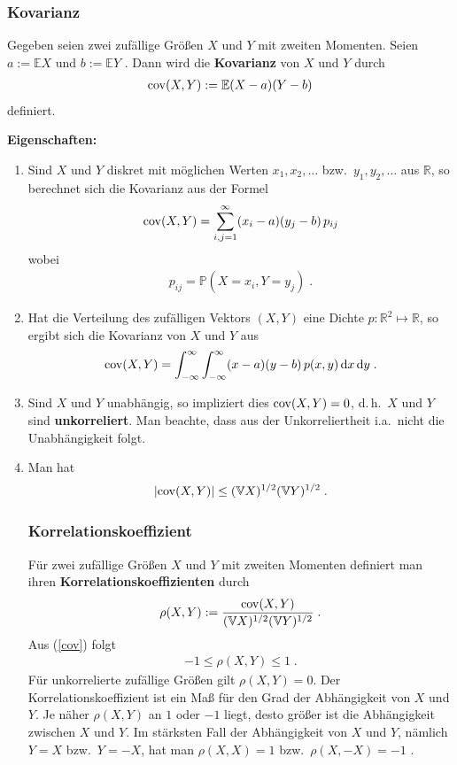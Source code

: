 \documentclass[ngerman,draft,parskip=half,twoside]{scrartcl}
\newcommand*{\R}{\mathbb{R}}      %
\newcommand*{\E}{\mathbb{E}}        %
\newcommand*{\V}{\mathbb{V}}        %
\newcommand*{\WKM}{\mathbb{P}}      %
\begin{document}
\subsubsection{Kovarianz}
Gegeben seien zwei zufällige Größen $X$ und $Y$ mit zweiten Momenten.
Seien $a:=\E X$ und $b:=\E Y$ . Dann wird die \textbf{Kovarianz} von $X$ und $Y$ durch
\begin{gather*}
  {\rm  cov}(X,Y):= \E(X-a)(Y-b)
\end{gather*}
definiert.

\textbf{Eigenschaften:}

\begin{enumerate}
\item
Sind $X$ und $Y$ diskret mit möglichen Werten $x_1,x_2,\ldots$ bzw.~$y_1,y_2,\ldots$ aus $\R$,
so berechnet sich die Kovarianz aus der Formel
  \begin{gather*}
    {\rm  cov}(X,Y)=\sum_{i,j=1}^\infty (x_i-a)(y_j-b)\, p_{ij}
  \end{gather*}
wobei
  \begin{gather*}
    p_{ij}=\WKM(X=x_i, Y=y_j)\;.
  \end{gather*}
\item
Hat die Verteilung des zufälligen Vektors $(X,Y)$ eine Dichte $p \colon\R^2\mapsto\R$, so
ergibt sich die Kovarianz von $X$ und $Y$ aus
  \begin{gather*}
    {\rm  cov}(X,Y)=\int_{-\infty}^\infty \int_{-\infty}^\infty (x-a)(y-b)\,p(x,y)\,\mathrm d x\, \mathrm d y\;.
  \end{gather*}
\item
Sind $X$ und $Y$ unabhängig, so impliziert dies ${\rm  cov}(X,Y)=0$, d.\,h.~$X$ und $Y$ sind
\textbf{unkorreliert}. Man beachte, dass aus der Unkorreliertheit i.a.~nicht die Unabhängigkeit folgt.
\item
Man hat
\begin{gather}
\label{cov}
|{\rm  cov}(X,Y)|\le (\V X)^{1/2}(\V Y)^{1/2}\;.
\end{gather}
\subsubsection{Korrelationskoeffizient}
Für zwei zufällige Größen $X$ und $Y$ mit zweiten Momenten definiert man ihren
\textbf{Korrelationskoeffizienten} durch
  \begin{gather*}
    \rho(X,Y):=\frac{{\rm  cov}(X,Y)}{(\V X)^{1/2}(\V Y)^{1/2}}\;.
  \end{gather*}
Aus (\ref{cov}) folgt
  \begin{gather*}
    -1\le \rho(X,Y)\le 1\;.
  \end{gather*}
Für unkorrelierte zufällige Größen gilt $\rho(X,Y)=0$.
 Der Korrelationskoeffizient ist ein Maß für den Grad der Abhängigkeit von
$X$ und $Y$. Je näher $\rho(X,Y)$ an $1$ oder $-1$ liegt, desto größer ist die
Abhängigkeit zwischen $X$ und $Y$. Im stärksten Fall
der Abhängigkeit von $X$ und $Y$, nämlich $Y=X$ bzw.~$Y=-X$, hat man $\rho(X,X)=1$ bzw.~$\rho(X,-X)=-1$ .
\end{enumerate}

\appendix
\clearpage
{}
\printindex
\end{document}
